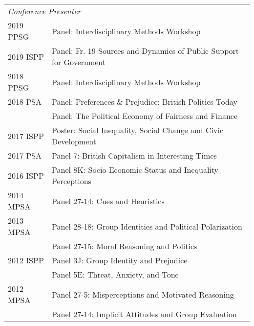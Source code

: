 \documentclass[12pt]{article}
\begin{document}
\begin{longtable}{@{}p{3.5cm}@{}l}%
    \multicolumn{2}{l}{\textit{Conference Presenter}}\\   
 			2019 PPSG & {Panel: Interdisciplinary Methods Workshop}\\  			
			
			2019 ISPP & {Panel: Fr. 19 Sources and Dynamics of Public Support for Government}\\
    
        	2018 PPSG & {Panel: Interdisciplinary Methods Workshop}\\             
    		
    		2018 PSA & {Panel: Preferences \& Prejudice: British Politics Today}\\            
			 
			 & {Panel: The Political Economy of Fairness and Finance}\\            

            2017 ISPP & {Poster: Social Inequality, Social Change and Civic Development}\\       
    
			2017 PSA & {Panel 7: British Capitalism in Interesting Times}\\            
            
            2016 ISPP & {Panel 8K: Socio-Economic Status and Inequality Perceptions}\\           
            
            2014 MPSA & {Panel 27-14: Cues and 
            Heuristics}\\            
            
            2013 MPSA & {Panel 28-18: Group Identities 
            and Political Polarization}\\
            
            & {Panel 27-15: Moral Reasoning and Politics}\\
            
            2012 ISPP & {Panel 3J: Group Identity and Prejudice}\\
            
            & {Panel 5E: Threat, Anxiety, and Tone}\\
            
            2012 MPSA & {Panel 27-5: Misperceptions 
            and Motivated Reasoning}\\
            
            & {Panel 27-14: Implicit Attitudes and Group Evaluation}\\
            

\end{longtable}
\end{document}
